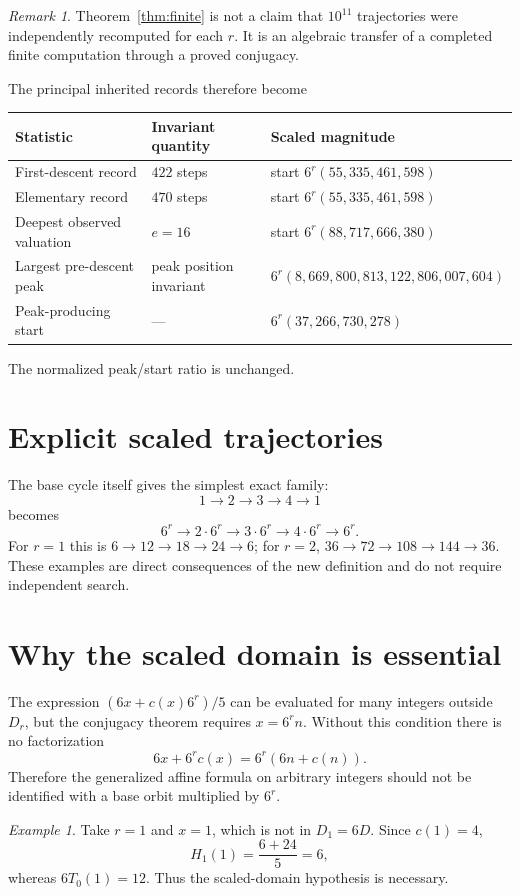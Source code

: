 \documentclass[11pt]{article}
\theoremstyle{remark}\newtheorem{remark}[theorem]{Remark}\newtheorem{example}[theorem]{Example}
\begin{document}
\begin{remark}
Theorem~\ref{thm:finite} is not a claim that $10^{11}$ trajectories were independently recomputed for each $r$. It is an algebraic transfer of a completed finite computation through a proved conjugacy.
\end{remark}

The principal inherited records therefore become
\begin{center}
\begin{tabular}{lll}\toprule
Statistic & Invariant quantity & Scaled magnitude\\\midrule
First-descent record & $422$ steps & start $6^r(55,335,461,598)$\\
Elementary record & $470$ steps & start $6^r(55,335,461,598)$\\
Deepest observed valuation & $e=16$ & start $6^r(88,717,666,380)$\\
Largest pre-descent peak & peak position invariant & $6^r(8,669,800,813,122,806,007,604)$\\
Peak-producing start & --- & $6^r(37,266,730,278)$\\\bottomrule
\end{tabular}
\end{center}
The normalized peak/start ratio is unchanged.

\section{Explicit scaled trajectories}
The base cycle itself gives the simplest exact family:
\[
1\to2\to3\to4\to1
\]
becomes
\[
6^r\to2\cdot6^r\to3\cdot6^r\to4\cdot6^r\to6^r.
\]
For $r=1$ this is $6\to12\to18\to24\to6$; for $r=2$, $36\to72\to108\to144\to36$. These examples are direct consequences of the new definition and do not require independent search.

\section{Why the scaled domain is essential}
The expression $(6x+c(x)6^r)/5$ can be evaluated for many integers outside $D_r$, but the conjugacy theorem requires $x=6^rn$. Without this condition there is no factorization
\[
6x+6^rc(x)=6^r(6n+c(n)).
\]
Therefore the generalized affine formula on arbitrary integers should not be identified with a base orbit multiplied by $6^r$.

\begin{example}
Take $r=1$ and $x=1$, which is not in $D_1=6D$. Since $c(1)=4$,
\[
H_1(1)=\frac{6+24}{5}=6,
\]
whereas $6T_0(1)=12$. Thus the scaled-domain hypothesis is necessary.
\end{example}
\end{document}

